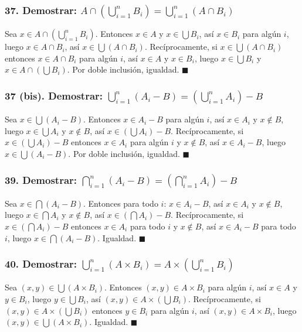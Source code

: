 \documentclass[12pt,a4paper]{article}
\begin{document}
\subsubsection*{\textcolor{accent}{37. Demostrar: $A\cap\left(\bigcup_{i=1}^n B_i\right)=\bigcup_{i=1}^n(A\cap B_i)$}}
Sea $x\in A\cap(\bigcup_{i=1}^n B_i)$. Entonces $x\in A$ y $x\in\bigcup B_i$, así $x\in B_i$ para algún $i$, luego $x\in A\cap B_i$, así $x\in\bigcup(A\cap B_i)$. Recíprocamente, si $x\in\bigcup(A\cap B_i)$ entonces $x\in A\cap B_i$ para algún $i$, así $x\in A$ y $x\in B_i$, luego $x\in\bigcup B_i$ y $x\in A\cap(\bigcup B_i)$. Por doble inclusión, igualdad. $\blacksquare$

\subsubsection*{\textcolor{accent}{37 (bis). Demostrar: $\bigcup_{i=1}^n(A_i-B)=\left(\bigcup_{i=1}^n A_i\right)-B$}}
Sea $x\in\bigcup(A_i-B)$. Entonces $x\in A_i-B$ para algún $i$, así $x\in A_i$ y $x\notin B$, luego $x\in\bigcup A_i$ y $x\notin B$, así $x\in(\bigcup A_i)-B$. Recíprocamente, si $x\in(\bigcup A_i)-B$ entonces $x\in A_i$ para algún $i$ y $x\notin B$, así $x\in A_i-B$, luego $x\in\bigcup(A_i-B)$. Por doble inclusión, igualdad. $\blacksquare$

\subsubsection*{\textcolor{accent}{39. Demostrar: $\bigcap_{i=1}^n(A_i-B)=\left(\bigcap_{i=1}^n A_i\right)-B$}}
Sea $x\in\bigcap(A_i-B)$. Entonces para todo $i$: $x\in A_i-B$, así $x\in A_i$ y $x\notin B$, luego $x\in\bigcap A_i$ y $x\notin B$, así $x\in(\bigcap A_i)-B$. Recíprocamente, si $x\in(\bigcap A_i)-B$ entonces $x\in A_i$ para todo $i$ y $x\notin B$, así $x\in A_i-B$ para todo $i$, luego $x\in\bigcap(A_i-B)$. Igualdad. $\blacksquare$

\subsubsection*{\textcolor{accent}{40. Demostrar: $\bigcup_{i=1}^n(A\times B_i)=A\times\left(\bigcup_{i=1}^n B_i\right)$}}
Sea $(x,y)\in\bigcup(A\times B_i)$. Entonces $(x,y)\in A\times B_i$ para algún $i$, así $x\in A$ y $y\in B_i$, luego $y\in\bigcup B_i$, así $(x,y)\in A\times(\bigcup B_i)$. Recíprocamente, si $(x,y)\in A\times(\bigcup B_i)$ entonces $y\in B_i$ para algún $i$, así $(x,y)\in A\times B_i$, luego $(x,y)\in\bigcup(A\times B_i)$. Igualdad. $\blacksquare$
\end{document}
